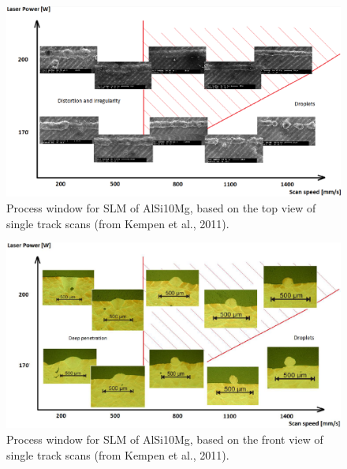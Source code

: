 \begin{figure}[th]
\centering
\includegraphics[scale=0.32]{Images/Pvs}
\decoRule
\caption[Process window for SLM of AlSi10Mg, based on the top view of single track scans]{Process window for SLM of AlSi10Mg, based on the top view of single track scans (from Kempen et al., 2011).}
\label{fig:Pvs}
\end{figure}

\begin{figure}[th]
\centering
\includegraphics[scale=0.32]{Images/Pvs2}
\decoRule
\caption[Process window for SLM of AlSi10Mg, based on the front view of single track scans]{Process window for SLM of AlSi10Mg, based on the front view of single track scans (from Kempen et al., 2011).}
\label{fig:Pvs2}
\end{figure}

